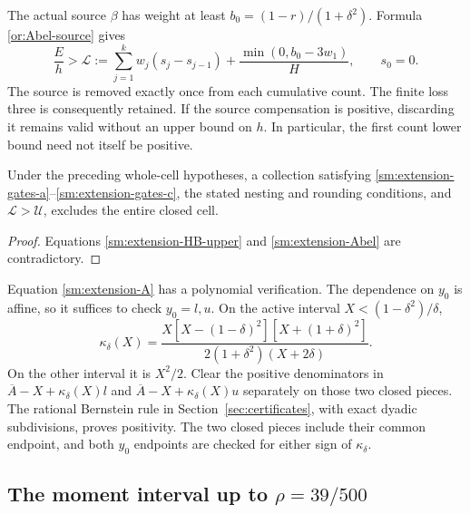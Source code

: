 The actual source $\beta$ has weight at least
$b_0=(1-r)/(1+\delta^2)$. Formula \eqref{or:Abel-source} gives
\begin{equation}\label{sm:extension-Abel}
 \frac Eh>
 \mathcal L:=\sum_{j=1}^kw_j(s_j-s_{j-1})
                   +\frac{\min(0,b_0-3w_1)}{H},
 \qquad s_0=0.
\end{equation}
The source is removed exactly once from each cumulative count.
The finite loss three is consequently retained. If the source
compensation is positive, discarding it remains valid without
an upper bound on $h$. In particular, the first count lower
bound need not itself be positive.

\begin{lemma}\label{sm:extension-cell}
Under the preceding whole-cell hypotheses, a collection satisfying
\eqref{sm:extension-gates-a}--\eqref{sm:extension-gates-c},
the stated nesting and rounding conditions, and
$\mathcal L>\mathcal U$, excludes the entire closed cell.
\end{lemma}
\begin{proof}
Equations \eqref{sm:extension-HB-upper} and
\eqref{sm:extension-Abel} are contradictory.
\end{proof}

Equation \eqref{sm:extension-A} has a polynomial verification.
The dependence on $y_0$ is affine, so it suffices to check
$y_0=l,u$. On the active interval
$X<(1-\delta^2)/\delta$,
\begin{equation}\label{sm:extension-kappa-active}
 \kappa_\delta(X)=
 \frac{X[X-(1-\delta)^2][X+(1+\delta)^2]}
             {2(1+\delta^2)(X+2\delta)}.
\end{equation}
On the other interval it is $X^2/2$.
Clear the positive denominators in
$\overline A-X+\kappa_\delta(X)l$ and
$\overline A-X+\kappa_\delta(X)u$ separately on those two
closed pieces. The rational Bernstein rule in
Section~\ref{sec:certificates}, with exact dyadic subdivisions,
proves positivity. The two closed pieces include their common
endpoint, and both $y_0$ endpoints are checked for either sign
of $\kappa_\delta$.

\subsection{The moment interval up to \texorpdfstring{$\rho=39/500$}{rho=39/500}}

